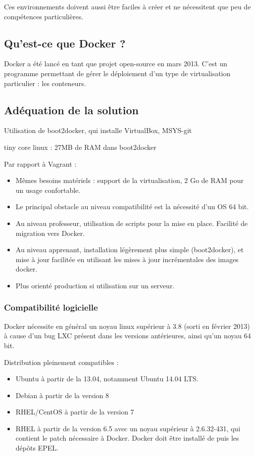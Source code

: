 \documentclass[a4paper,11pt]{report}
\begin{document}
Ces environnements doivent aussi être faciles à créer et ne nécessitent que peu de compétences
particulières.

\subsection{Qu'est-ce que Docker ?}

Docker\cite{website:whatis-docker} a été lancé en tant que projet open-source en mars 2013.
C'est un programme permettant de gérer le déploiement d'un type de virtualisation particulier : les conteneurs.
  
\subsection{Adéquation de la solution}

Utilisation de boot2docker, qui installe VirtualBox, MSYS-git

tiny core linux : 27MB de RAM dans  boot2docker

Par rapport à Vagrant :
\begin{itemize}
  \item Mêmes besoins matériels : support de la virtualisation, 2 Go de RAM pour un usage confortable.
  \item Le principal obstacle au niveau compatibilité est la nécessité d'un OS 64 bit.
  \item Au niveau professeur, utilisation de scripts pour la mise en place. Facilité de migration vers Docker.
  \item Au niveau apprenant, installation légèrement plus simple (boot2docker), et mise à jour facilitée en utilisant les mises à jour incrémentales des images docker.
  \item Plus orienté production si utilisation sur un serveur.
\end{itemize}

\subsubsection{Compatibilité logicielle}

Docker nécessite en général un noyau linux supérieur à 3.8 (sorti en février 2013) à cause d'un bug LXC\cite{website:bug-lxc} présent dans les versions antérieures, ainsi qu'un noyau 64 bit.

Distribution pleinement compatibles :
\begin{itemize}
  \item Ubuntu à partir de la 13.04, notamment Ubuntu 14.04 LTS.
  \item Debian à partir de la version 8
  \item RHEL/CentOS à partir de la version 7
  \item RHEL à partir de la version 6.5 avec un noyau supérieur à 2.6.32-431, qui contient le patch nécessaire à Docker. Docker doit être installé de puis les dépôts EPEL.
\end{itemize}
\end{document}
